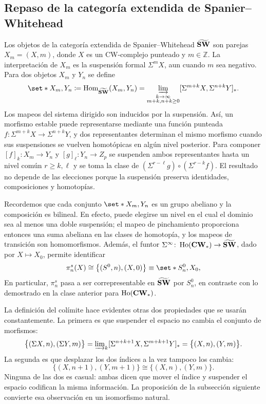 \subsection{Repaso de la categoría extendida de Spanier--Whitehead}
Los objetos de la categoría extendida de Spanier--Whitehead $\widetilde{\mathbf{SW}}$ son parejas $X_m=(X,m)$, donde $X$ es un CW-complejo punteado y $m\in\mathbb Z$. La interpretación de $X_m$ es la suspensión formal $\Sigma^mX$, aun cuando $m$ sea negativo. Para dos objetos $X_m$ y $Y_n$ se define
\[
\set*{X_m,Y_n}\coloneqq\Hom_{\ESW}(X_m,Y_n)=\varinjlim_{\substack{k\to\infty\\m+k,n+k\geq0}}[\Sigma^{m+k}X,\Sigma^{n+k}Y]_*.
\]
Los mapeos del sistema dirigido son inducidos por la suspensión. Así, un morfismo estable puede representarse mediante una función punteada $f\colon\Sigma^{m+k}X\to\Sigma^{n+k}Y$, y dos representantes determinan el mismo morfismo cuando sus suspensiones se vuelven homotópicas en algún nivel posterior. Para componer $[f]_k\colon X_m\to Y_n$ y $[g]_\ell\colon Y_n\to Z_p$ se suspenden ambos representantes hasta un nivel común $r\geq k,\ell$ y se toma la clase de $(\Sigma^{r-\ell}g)\circ(\Sigma^{r-k}f)$. El resultado no depende de las elecciones porque la suspensión preserva identidades, composiciones y homotopías.

Recordemos que cada conjunto $\set*{X_m,Y_n}$ es un grupo abeliano y la composición es bilineal. En efecto, puede elegirse un nivel en el cual el dominio sea al menos una doble suspensión; el mapeo de pinchamiento proporciona entonces una suma abeliana en las clases de homotopía, y los mapeos de transición son homomorfismos. Además, el funtor $\Sigma^\infty\colon\operatorname{Ho}(\mathbf{CW}_*)\to\widetilde{\mathbf{SW}}$, dado por $X\mapsto X_0$, permite identificar
\[
\pi_n^s(X)\cong\bigl\{(S^0,n),(X,0)\bigr\}\equiv\set*{S^0_n,X_0},
\]
En particular, $\pi_n^s$ pasa a ser correpresentable en $\widetilde{\mathbf{SW}}$ por $S^0_n$, en contraste con lo demostrado en la clase anterior para $\operatorname{Ho}(\mathbf{CW}_*)$.



La definición del colímite hace evidentes otras dos propiedades que se usarán constantemente. La primera es que suspender el espacio no cambia el conjunto de morfismos:
\[
\bigl\{(\Sigma X,n),(\Sigma Y,m)\bigr\}
=\varinjlim\nolimits_k[\Sigma^{n+k+1}X,\Sigma^{m+k+1}Y]_*
=\bigl\{(X,n),(Y,m)\bigr\}.
\]
La segunda es que desplazar los dos índices a la vez tampoco los cambia:
\[
\bigl\{(X,n+1),(Y,m+1)\bigr\}\cong\bigl\{(X,n),(Y,m)\bigr\}.
\]
Ninguna de las dos es casual: ambas dicen que mover el índice y suspender el espacio codifican la misma información. La proposición de la subsección siguiente convierte esa observación en un isomorfismo natural.

